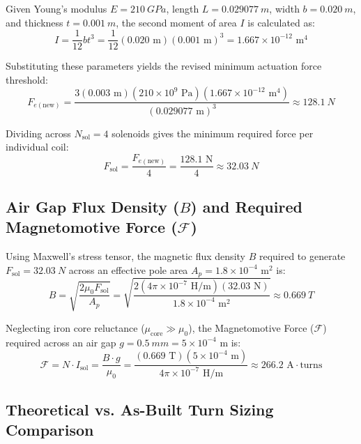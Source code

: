 Given Young's modulus $E = \SI{210}{GPa}$, length $L = \SI{0.029077}{m}$, width $b = \SI{0.020}{m}$, and thickness $t = \SI{0.001}{m}$, the second moment of area $I$ is calculated as:
\begin{equation}
	I = \frac{1}{12} b t^3 = \frac{1}{12} (0.020\text{ m})(0.001\text{ m})^3 = 1.667 \times 10^{-12}\text{ m}^4
\end{equation}

Substituting these parameters yields the revised minimum actuation force threshold:
\begin{equation}
	F_{e(\text{new})} = \frac{3(0.003\text{ m})(210 \times 10^9\text{ Pa})(1.667 \times 10^{-12}\text{ m}^4)}{(0.029077\text{ m})^3} \approx \SI{128.1}{N}
\end{equation}

Dividing across $N_{\text{sol}} = 4$ solenoids gives the minimum required force per individual coil:
\begin{equation}
	F_{\text{sol}} = \frac{F_{e(\text{new})}}{4} = \frac{128.1\text{ N}}{4} \approx \SI{32.03}{N}
\end{equation}

\subsection{Air Gap Flux Density ($B$) and Required Magnetomotive Force ($\mathcal{F}$)}
Using Maxwell's stress tensor, the magnetic flux density $B$ required to generate $F_{\text{sol}} = \SI{32.03}{N}$ across an effective pole area $A_p = 1.8 \times 10^{-4}\text{ m}^2$ is:
\begin{equation}
	B = \sqrt{\frac{2 \mu_0 F_{\text{sol}}}{A_p}} = \sqrt{\frac{2 (4\pi \times 10^{-7}\text{ H/m})(32.03\text{ N})}{1.8 \times 10^{-4}\text{ m}^2}} \approx \SI{0.669}{T}
\end{equation}

Neglecting iron core reluctance ($\mu_{\text{core}} \gg \mu_0$), the Magnetomotive Force ($\mathcal{F}$) required across an air gap $g = \SI{0.5}{mm} = 5 \times 10^{-4}\text{ m}$ is:
\begin{equation}
	\mathcal{F} = N \cdot I_{\text{sol}} = \frac{B \cdot g}{\mu_0} = \frac{(0.669\text{ T})(5 \times 10^{-4}\text{ m})}{4\pi \times 10^{-7}\text{ H/m}} \approx 266.2\text{ A}\cdot\text{turns}
\end{equation}

\subsection{Theoretical vs. As-Built Turn Sizing Comparison}

